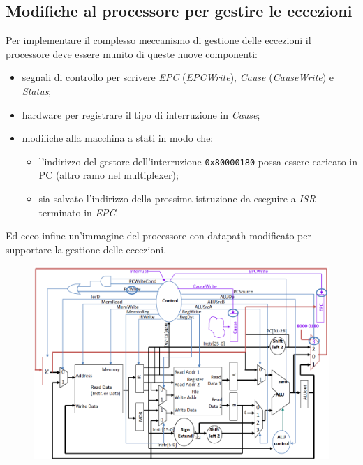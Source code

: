 \documentclass[class=book, crop=false, oneside]{standalone}
\begin{document}
\subsection{Modifiche al processore per gestire le eccezioni}
Per implementare il complesso meccanismo di gestione delle eccezioni il processore deve essere munito di queste nuove componenti:
\begin{itemize}
	\item segnali di controllo per scrivere \emph{EPC} (\emph{EPCWrite}), \emph{Cause} (\emph{CauseWrite}) e \emph{Status};
	\item hardware per registrare il tipo di interruzione in \emph{Cause};
	\item modifiche alla macchina a stati in modo che:
	\begin{itemize}
		\item l'indirizzo del gestore dell'interruzione \texttt{0x80000180} possa essere caricato in PC (altro ramo nel multiplexer);
		\item sia salvato l'indirizzo della prossima istruzione da eseguire a \emph{ISR} terminato in \emph{EPC}.
	\end{itemize}
\end{itemize}
Ed ecco infine un'immagine del processore con datapath modificato per supportare la gestione delle eccezioni.
\begin{figure}[!h]
	\centering
	\includegraphics[width=\textwidth,keepaspectratio]{final-datapath}
\end{figure}
\end{document}
